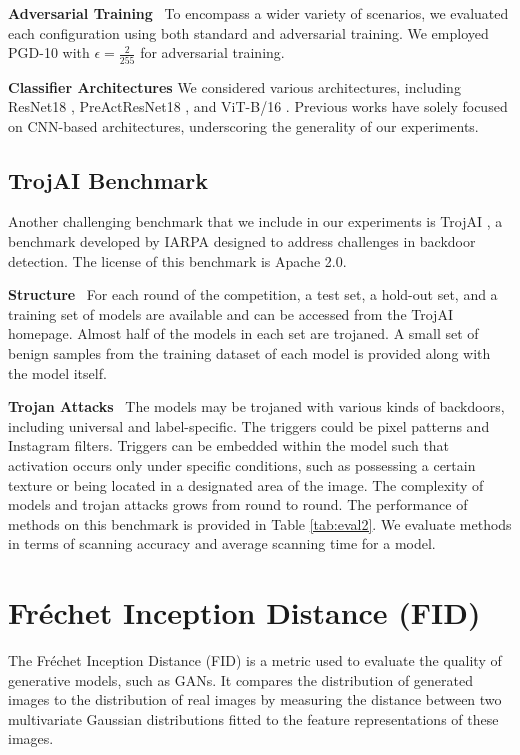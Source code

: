 \textbf{Adversarial Training} \ To encompass a wider variety of scenarios, we evaluated each configuration using both standard and adversarial training. We employed PGD-10 with $\epsilon = \frac{2}{255}$ for adversarial training. 


\textbf{Classifier Architectures} We considered various architectures, including ResNet18 \cite{resnet}, PreActResNet18 \cite{preact}, and ViT-B/16 \cite{vit}. Previous works have solely focused on CNN-based architectures, underscoring the generality of our experiments.


\subsection{TrojAI Benchmark} \label{troj+Od_bench}
Another challenging benchmark that we include in our experiments is TrojAI \cite{trojai}, a benchmark developed by IARPA designed to address challenges in backdoor detection. The license of this benchmark is Apache 2.0.

\textbf{Structure} \ For each round of the competition, a test set, a hold-out set, and a training set of models are available and can be accessed from the TrojAI homepage. Almost half of the models in each set are trojaned. A small set of benign samples from the training dataset of each model is provided along with the model itself.

\textbf{Trojan Attacks} \ The models may be trojaned with various kinds of backdoors, including universal and label-specific. The triggers could be pixel patterns and Instagram filters. Triggers can be embedded within the model such that activation occurs only under specific conditions, such as possessing a certain texture or being located in a designated area of the image. The complexity of models and trojan attacks grows from round to round. The performance of methods on this benchmark is provided in Table \ref{tab:eval2}. We evaluate methods in terms of scanning accuracy and average scanning time for a model. 




\section{Fréchet Inception Distance (FID)  } \label{sec:FID}

The Fréchet Inception Distance (FID) is a metric used to evaluate the quality of generative models, such as GANs. It compares the distribution of generated images to the distribution of real images by measuring the distance between two multivariate Gaussian distributions fitted to the feature representations of these images.
 
